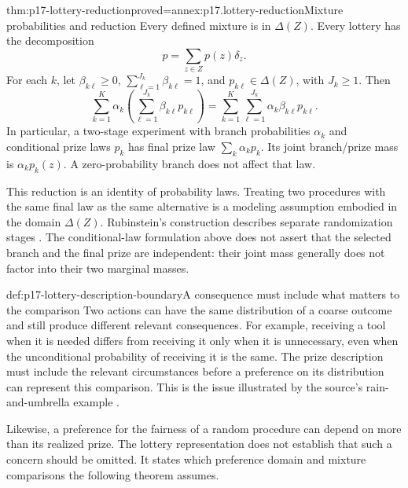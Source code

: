 \begin{hbtheorem}{thm:p17-lottery-reduction}{proved=annex:p17.lottery-reduction}{Mixture probabilities and reduction}
Every defined mixture is in \(\Delta(Z)\). Every lottery has the
decomposition
\[
                         p=\sum_{z\in Z}p(z)\delta_z.
\]
For each \(k\), let \(\beta_{k\ell}\geq0\),
\(\sum_{\ell=1}^{J_k}\beta_{k\ell}=1\), and
\(p_{k\ell}\in\Delta(Z)\), with \(J_k\geq1\). Then
\[
 \sum_{k=1}^K\alpha_k
       \left(\sum_{\ell=1}^{J_k}\beta_{k\ell}p_{k\ell}\right)
 =\sum_{k=1}^K\sum_{\ell=1}^{J_k}
                       \alpha_k\beta_{k\ell}p_{k\ell}.
\]
In particular, a two-stage experiment with branch probabilities
\(\alpha_k\) and conditional prize laws \(p_k\) has final prize law
\(\sum_k\alpha_kp_k\). Its joint branch/prize mass is
\(\alpha_kp_k(z)\). A zero-probability branch does not affect that law.
\end{hbtheorem}

This reduction is an identity of probability laws. Treating two procedures
with the same final law as the same alternative is a modeling assumption
embodied in the domain \(\Delta(Z)\). Rubinstein's construction describes
separate randomization stages \cite[pp.~96--97]{Rubinstein2015LectureNotes}.
The conditional-law formulation above does not assert that the selected
branch and the final prize are independent: their joint mass generally
does not factor into their two marginal masses.

\begin{hbwarning}{def:p17-lottery-description-boundary}{A consequence must include what matters to the comparison}
Two actions can have the same distribution of a coarse outcome and still
produce different relevant consequences. For example, receiving a tool
when it is needed differs from receiving it only when it is unnecessary,
even when the unconditional probability of receiving it is the same.
The prize description must include the relevant circumstances before a
preference on its distribution can represent this comparison. This is the
issue illustrated by the source's rain-and-umbrella example
\cite[pp.~94--95]{Rubinstein2015LectureNotes}.

Likewise, a preference for the fairness of a random procedure can depend on
more than its realized prize. The lottery representation does not establish
that such a concern should be omitted. It states which preference domain
and mixture comparisons the following theorem assumes.
\end{hbwarning}

